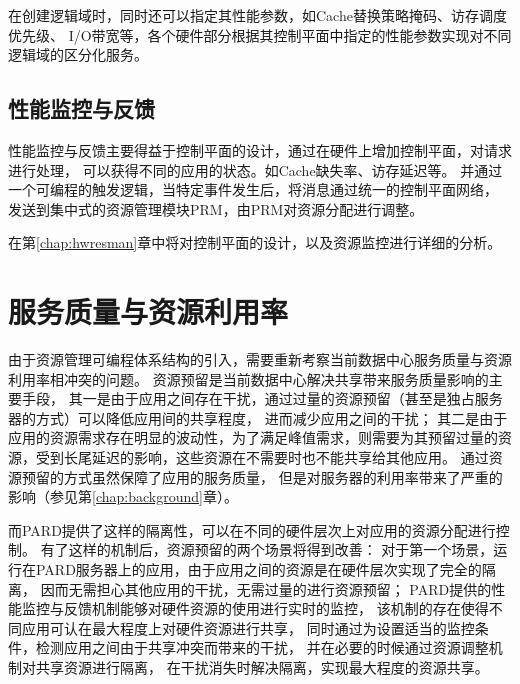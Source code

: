 在创建逻辑域时，同时还可以指定其性能参数，如Cache替换策略掩码、访存调度优先级、
I/O带宽等，各个硬件部分根据其控制平面中指定的性能参数实现对不同逻辑域的区分化服务。



\subsection{性能监控与反馈}

性能监控与反馈主要得益于控制平面的设计，通过在硬件上增加控制平面，对请求进行处理，
可以获得不同的应用的状态。如Cache缺失率、访存延迟等。
并通过一个可编程的触发逻辑，当特定事件发生后，将消息通过统一的控制平面网络，
发送到集中式的资源管理模块PRM，由PRM对资源分配进行调整。

在第\ref{chap:hwresman}章中将对控制平面的设计，以及资源监控进行详细的分析。


\section{服务质量与资源利用率}

由于资源管理可编程体系结构的引入，需要重新考察当前数据中心服务质量与资源利用率相冲突的问题。
资源预留是当前数据中心解决共享带来服务质量影响的主要手段，
其一是由于应用之间存在干扰，通过过量的资源预留（甚至是独占服务器的方式）可以降低应用间的共享程度，
进而减少应用之间的干扰；
其二是由于应用的资源需求存在明显的波动性，为了满足峰值需求，则需要为其预留过量的资源，受到长尾延迟的影响，这些资源在不需要时也不能共享给其他应用。
通过资源预留的方式虽然保障了应用的服务质量，
但是对服务器的利用率带来了严重的影响（参见第\ref{chap:background}章）。


而PARD提供了这样的隔离性，可以在不同的硬件层次上对应用的资源分配进行控制。
有了这样的机制后，资源预留的两个场景将得到改善：
对于第一个场景，运行在PARD服务器上的应用，由于应用之间的资源是在硬件层次实现了完全的隔离，
因而无需担心其他应用的干扰，无需过量的进行资源预留；
PARD提供的性能监控与反馈机制能够对硬件资源的使用进行实时的监控，
该机制的存在使得不同应用可认在最大程度上对硬件资源进行共享，
同时通过为设置适当的监控条件，检测应用之间由于共享冲突而带来的干扰， 
并在必要的时候通过资源调整机制对共享资源进行隔离，
在干扰消失时解决隔离，实现最大程度的资源共享。

